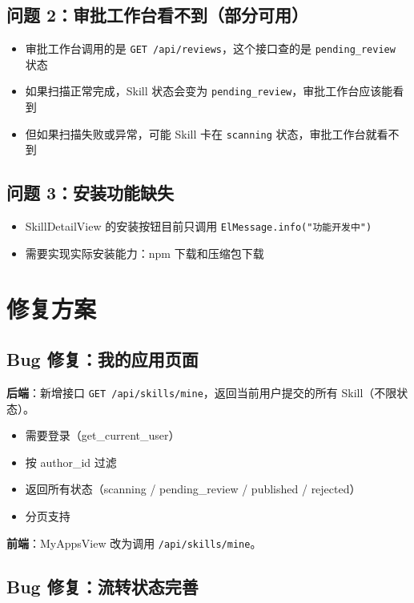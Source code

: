 \documentclass[11pt,a4paper]{article}
\begin{document}
\subsection{问题 2：审批工作台看不到（部分可用）}

\begin{itemize}[nosep]
  \item 审批工作台调用的是 \texttt{GET /api/reviews}，这个接口查的是 \texttt{pending\_review} 状态
  \item 如果扫描正常完成，Skill 状态会变为 \texttt{pending\_review}，审批工作台应该能看到
  \item 但如果扫描失败或异常，可能 Skill 卡在 \texttt{scanning} 状态，审批工作台就看不到
\end{itemize}

\subsection{问题 3：安装功能缺失}

\begin{itemize}[nosep]
  \item SkillDetailView 的安装按钮目前只调用 \texttt{ElMessage.info("功能开发中")}
  \item 需要实现实际安装能力：npm 下载和压缩包下载
\end{itemize}

\section{修复方案}

\subsection{Bug 修复：我的应用页面}

\textbf{后端}：新增接口 \texttt{GET /api/skills/mine}，返回当前用户提交的所有 Skill（不限状态）。

\begin{itemize}[nosep]
  \item 需要登录（get\_current\_user）
  \item 按 author\_id 过滤
  \item 返回所有状态（scanning / pending\_review / published / rejected）
  \item 分页支持
\end{itemize}

\textbf{前端}：MyAppsView 改为调用 \texttt{/api/skills/mine}。

\subsection{Bug 修复：流转状态完善}
\end{document}
